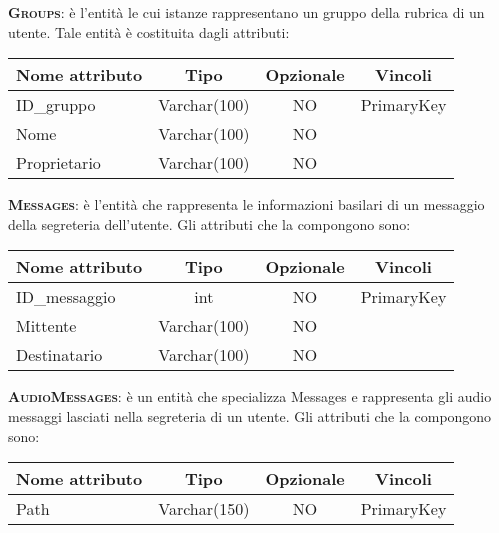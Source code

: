 \begin{description}
	\item{\scshape\bfseries Groups}: è l'entità le cui istanze rappresentano un gruppo della rubrica di un utente. Tale entità è costituita dagli attributi:

\begin{center}
\begin{tabular}{lccc}
\toprule
Nome attributo & Tipo & Opzionale & Vincoli\\
\midrule %
ID\_gruppo & Varchar(100) & NO & PrimaryKey\\
Nome & Varchar(100) & NO &\\
Proprietario & Varchar(100) & NO &\\
\bottomrule
\end{tabular}
\end{center}	
	
	\item{\scshape\bfseries Messages}: è l'entità che rappresenta le informazioni basilari di un messaggio della segreteria dell'utente. Gli attributi che la compongono sono:

\begin{center}
\begin{tabular}{lccc}
\toprule
Nome attributo & Tipo & Opzionale & Vincoli\\
\midrule %
ID\_messaggio & int & NO & PrimaryKey\\
Mittente & Varchar(100) & NO & \\
Destinatario & Varchar(100) & NO & \\
\bottomrule
\end{tabular}
\end{center}	
	
	\item{\scshape\bfseries AudioMessages}: è un entità che specializza Messages e rappresenta gli audio messaggi lasciati nella segreteria di un utente. Gli attributi che la compongono sono:
	
\begin{center}
\begin{tabular}{lccc}
\toprule
Nome attributo & Tipo & Opzionale & Vincoli\\
\midrule %
Path & Varchar(150) & NO & PrimaryKey\\
\bottomrule
\end{tabular}
\end{center}		
	

\end{description}

